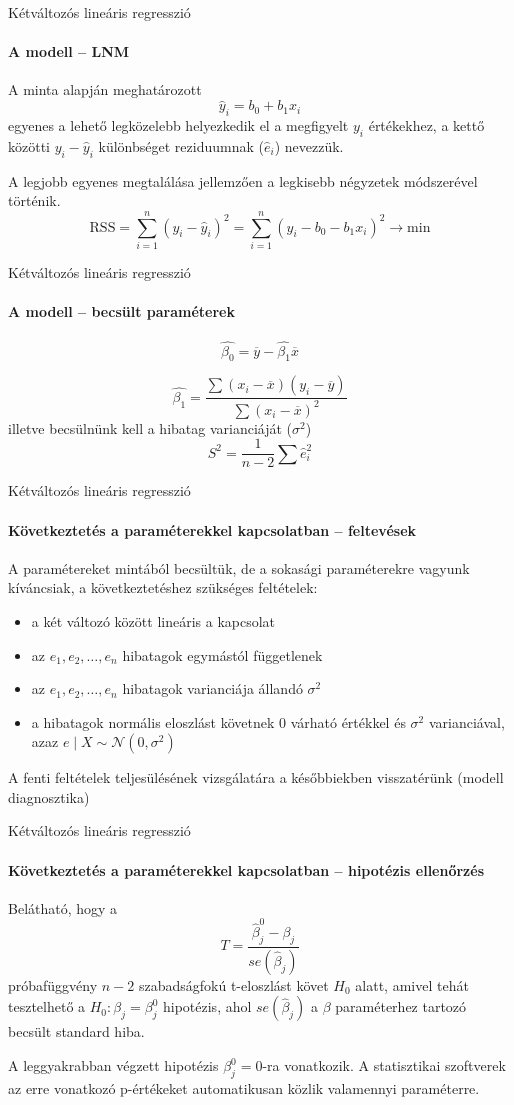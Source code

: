 \documentclass[10pt]{beamer}
\begin{document}
\begin{frame}{Kétváltozós lineáris regresszió}
\framesubtitle{A modell -- LNM}

A minta alapján meghatározott 
\[
\hat{y}_i = b_0 + b_1 x_i
\]
egyenes a lehető legközelebb helyezkedik el a megfigyelt $y_i$ értékekhez, a kettő közötti $y_i - \hat{y}_i$ különbséget reziduumnak ($\hat{e}_i$) nevezzük.

A legjobb egyenes megtalálása jellemzően a legkisebb négyzetek módszerével történik.
\[
\text{RSS} = \sum_{i = 1} ^ n \left(y_i - \hat{y}_i \right)^2 = \sum_{i = 1} ^ n \left(y_i - b_0 - b_1 x_i \right)^2 \to \text{min}
\]
\end{frame}

\begin{frame}{Kétváltozós lineáris regresszió}
\framesubtitle{A modell -- becsült paraméterek}
\[
\hat{\beta_0} =  \overline{y} - \hat{\beta_1} \overline{x}
\]

\[
\hat{\beta_1} =  \dfrac{\sum \left(x_i - \overline{x}\right)\left(y_i - \overline{y}\right)}{\sum \left(x_i - \overline{x}\right)^2}
\]
illetve becsülnünk kell a hibatag varianciáját ($\sigma^2$)
\[
S^2 = \dfrac{1}{n-2} \sum \hat{e}_i^2
\]
\end{frame}

\begin{frame}{Kétváltozós lineáris regresszió}
\framesubtitle{Következtetés a paraméterekkel kapcsolatban -- feltevések}
A paramétereket mintából becsültük, de a sokasági paraméterekre vagyunk kíváncsiak, a következtetéshez szükséges feltételek:
\begin{itemize}
\item a két változó között lineáris a kapcsolat
\item az $e_1, e_2, \dots, e_n$ hibatagok egymástól függetlenek
\item az $e_1, e_2, \dots, e_n$ hibatagok varianciája állandó $\sigma^2$
\item a hibatagok normális eloszlást követnek 0 várható értékkel és $\sigma^2$ varianciával, azaz $e \mid X \sim \mathcal{N}\left(0, \sigma^2 \right)$
\end{itemize}
A fenti feltételek teljesülésének vizsgálatára a későbbiekben visszatérünk (modell diagnosztika)
\end{frame}

\begin{frame}{Kétváltozós lineáris regresszió}
\framesubtitle{Következtetés a paraméterekkel kapcsolatban -- hipotézis ellenőrzés}
Belátható, hogy a
\[
T = \dfrac{\hat{\beta}_j^0 - \beta_j}{se\left(\hat{\beta}_j \right)}
\]
próbafüggvény $n-2$ szabadságfokú t-eloszlást követ $H_0$ alatt, amivel tehát tesztelhető a $H_0:\beta_j = \beta_j^0$ hipotézis, ahol $se\left(\hat{\beta}_j \right)$ a $\beta$ paraméterhez tartozó becsült standard hiba.

A leggyakrabban végzett hipotézis $\beta_j^0 = 0$-ra vonatkozik. A statisztikai szoftverek az erre vonatkozó p-értékeket automatikusan közlik valamennyi paraméterre.
\end{frame}
\end{document}
